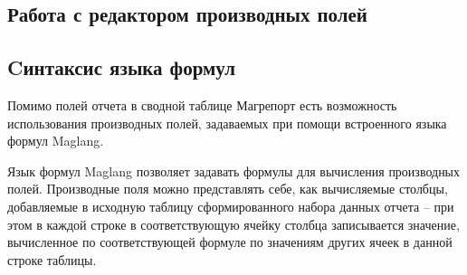 \documentclass[../user-manual.tex]{subfiles}
\begin{document}
	\subsection{Работа с редактором производных полей}
	
	
	\subsection{Cинтаксис языка формул}
	
	Помимо полей отчета в сводной таблице Магрепорт есть возможность использования производных полей, задаваемых при помощи встроенного языка формул Maglang.
	
	Язык формул Maglang позволяет задавать формулы для вычисления производных полей. Производные поля можно представлять себе, как вычисляемые столбцы, добавляемые в исходную таблицу сформированного набора данных отчета -- при этом в каждой строке в соответствующую ячейку столбца записывается значение, вычисленное по соответствующей формуле по значениям других ячеек в данной строке таблицы. 
	
\end{document}
